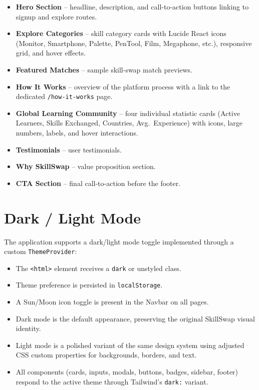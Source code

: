 \documentclass[12pt,a4paper]{report}
\begin{document}
\begin{itemize}[noitemsep]
  \item \textbf{Hero Section} -- headline, description, and call-to-action
        buttons linking to signup and explore routes.
  \item \textbf{Explore Categories} -- skill category cards with Lucide React
        icons (Monitor, Smartphone, Palette, PenTool, Film, Megaphone, etc.),
        responsive grid, and hover effects.
  \item \textbf{Featured Matches} -- sample skill-swap match previews.
  \item \textbf{How It Works} -- overview of the platform process with a link
        to the dedicated \texttt{/how-it-works} page.
  \item \textbf{Global Learning Community} -- four individual statistic cards
        (Active Learners, Skills Exchanged, Countries, Avg.\ Experience) with
        icons, large numbers, labels, and hover interactions.
  \item \textbf{Testimonials} -- user testimonials.
  \item \textbf{Why SkillSwap} -- value proposition section.
  \item \textbf{CTA Section} -- final call-to-action before the footer.
\end{itemize}

\section{Dark / Light Mode}
The application supports a dark/light mode toggle implemented through a custom
\texttt{ThemeProvider}:

\begin{itemize}[noitemsep]
  \item The \texttt{<html>} element receives a \texttt{dark} or unstyled class.
  \item Theme preference is persisted in \texttt{localStorage}.
  \item A Sun/Moon icon toggle is present in the Navbar on all pages.
  \item Dark mode is the default appearance, preserving the original SkillSwap
        visual identity.
  \item Light mode is a polished variant of the same design system using
        adjusted CSS custom properties for backgrounds, borders, and text.
  \item All components (cards, inputs, modals, buttons, badges, sidebar, footer)
        respond to the active theme through Tailwind's \texttt{dark:} variant.
\end{itemize}
\end{document}
